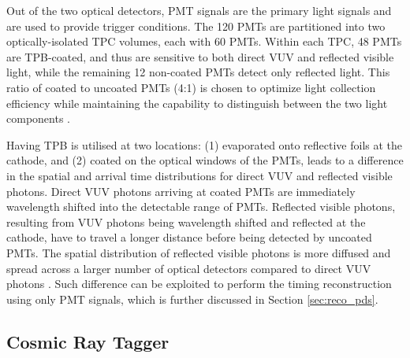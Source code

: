 Out of the two optical detectors, PMT signals are the primary light signals and are used to provide trigger conditions.
The 120 PMTs are partitioned into two optically-isolated TPC volumes, each with 60 PMTs.
Within each TPC, 48 PMTs are TPB-coated, and thus are sensitive to both direct VUV and reflected visible light, while the remaining 12 non-coated PMTs detect only reflected light. 
This ratio of coated to uncoated PMTs (4:1) is chosen to optimize light collection efficiency while maintaining the capability to distinguish between the two light components \cite{sbnd_pds_paper}. 

Having TPB is utilised at two locations: (1) evaporated onto reflective foils at the cathode, and (2) coated on the optical windows of the PMTs, leads to a difference in the spatial and arrival time distributions for direct VUV and reflected visible photons.
Direct VUV photons arriving at coated PMTs are immediately wavelength shifted into the detectable range of PMTs.
Reflected visible photons, resulting from VUV photons being wavelength shifted and reflected at the cathode, have to travel a longer distance before being detected by uncoated PMTs.
The spatial distribution of reflected visible photons is more diffused and spread across a larger number of optical detectors compared to direct VUV photons \cite{PatrickPhD}.
Such difference can be exploited to perform the timing reconstruction using only PMT signals, which is further discussed in Section \ref{sec:reco_pds}.

\subsection{Cosmic Ray Tagger}
\label{sec:sbnd_crt}

